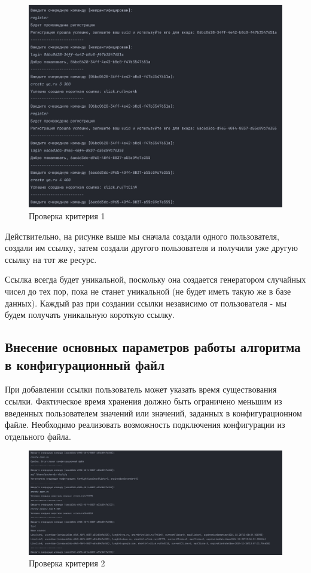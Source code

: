 \documentclass[a4paper, 14pt]{article}
\begin{document}
\begin{figure}[H]
	\centering
	\includegraphics[width=17cm]{resources/5.png}
	\caption{Проверка критерия 1}
\end{figure}

Действительно, на рисунке выше мы сначала создали одного пользователя, создали им ссылку, затем создали другого пользователя и получили уже другую ссылку на тот же ресурс.

Ссылка всегда будет уникальной, поскольку она создается генератором случайных чисел до тех пор, пока не станет уникальной (не будет иметь такую же в базе данных). Каждый раз при создании ссылки независимо от пользователя - мы будем получать уникальную короткую ссылку.

\subsection{Внесение основных параметров работы алгоритма в конфигурационный файл}

При добавлении ссылки пользователь может указать время существования ссылки. Фактическое время хранения должно быть ограничено меньшим из введенных пользователем значений или значений, заданных в конфигурационном файле. Необходимо реализовать возможность подключения конфигурации из отдельного файла.

\begin{figure}[H]
	\centering
	\includegraphics[width=17cm]{resources/6.png}
	\caption{Проверка критерия 2}
\end{figure}
\end{document}
